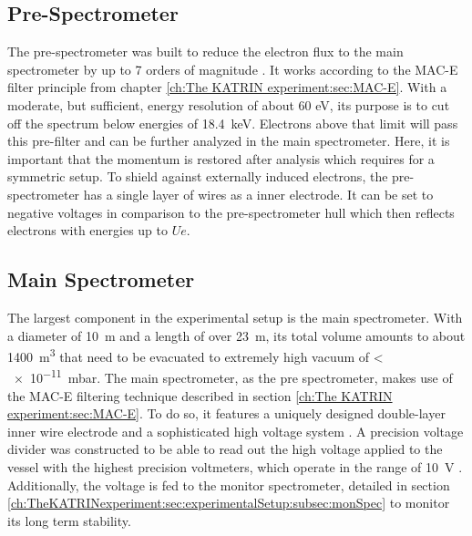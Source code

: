       \subsection{Pre-Spectrometer}
      \label{ch:The KATRIN experiment:sec:Experimental setup:subsec:PreSpectrometer}
      The pre-spectrometer was built to reduce the electron flux to the main spectrometer by up to 7 orders of magnitude \cite{statusPSWolf}. It works according to the MAC-E filter principle from chapter \ref{ch:The KATRIN experiment:sec:MAC-E}. With a moderate, but sufficient, energy resolution of about 60 eV, its purpose is to cut off the spectrum below energies of \SI{18.4}{\kilo\electronvolt}. Electrons above that limit will pass this pre-filter and can be further analyzed in the main spectrometer. Here, it is important that the momentum is restored after analysis which requires for a symmetric setup. To shield against externally induced electrons, the pre-spectrometer has a single layer of wires as a inner electrode. It can be set to negative voltages in comparison to the pre-spectrometer hull which then reflects electrons with energies up to $Ue$.
      
      \subsection{Main Spectrometer}
      \label{ch:The KATRIN experiment:sec:Experimental setup:subsec:MainSpec}
      The largest component in the experimental setup is the main spectrometer. With a diameter of \SI{10}{\meter} and a length of over \SI{23}{\meter}, its total volume amounts to about \SI{1400}{\cubic\meter} that need to be evacuated to extremely high vacuum of < \SI{e-11}{\milli\bar}. The main spectrometer, as the pre spectrometer, makes use of the MAC-E filtering technique described in section \ref{ch:The KATRIN experiment:sec:MAC-E}. To do so, it features a uniquely designed double-layer inner wire electrode and a sophisticated high voltage system \cite{mainSpecElectrodeDesign}. A precision voltage divider was constructed to be able to read out the high voltage applied to the vessel with the highest precision voltmeters, which operate in the range of \SI{10}{\volt} \cite{highVoltageDivider}. Additionally, the voltage is fed to the monitor spectrometer, detailed in section \ref{ch:TheKATRINexperiment:sec:experimentalSetup:subsec:monSpec} to monitor its long term stability.
      
